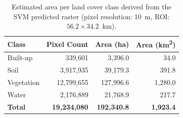 \documentclass{article}
\begin{document}
\begin{table}[H]
\centering
\caption{Estimated area per land cover class derived from the SVM predicted
raster (pixel resolution: 10~m, ROI: $56.2 \times 34.2$~km).}
\label{tab:area_per_class}
\begin{tabular}{lrrr}
\toprule
\textbf{Class} & \textbf{Pixel Count} & \textbf{Area (ha)} & \textbf{Area (km\textsuperscript{2})} \\
\midrule
Built-up   &    339{,}601 &   3{,}396.0 &    34.0 \\
Soil       &  3{,}917{,}935 &  39{,}179.3 &   391.8 \\
Vegetation & 12{,}799{,}655 & 127{,}996.6 & 1{,}280.0 \\
Water      &  2{,}176{,}889 &  21{,}768.9 &   217.7 \\
\midrule
\textbf{Total} & \textbf{19{,}234{,}080} & \textbf{192{,}340.8} & \textbf{1{,}923.4} \\
\bottomrule
\end{tabular}
\end{table}
\end{document}
